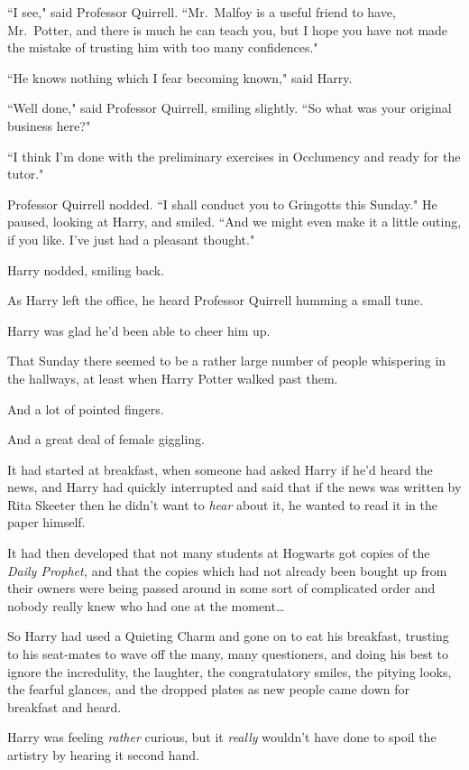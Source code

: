 ``I see," said Professor Quirrell. ``Mr.~Malfoy is a useful friend to have, Mr.~Potter, and there is much he can teach you, but I hope you have not made the mistake of trusting him with too many confidences."

``He knows nothing which I fear becoming known," said Harry.

``Well done," said Professor Quirrell, smiling slightly. ``So what was your original business here?"

``I think I'm done with the preliminary exercises in Occlumency and ready for the tutor."

Professor Quirrell nodded. ``I shall conduct you to Gringotts this Sunday." He paused, looking at Harry, and smiled. ``And we might even make it a little outing, if you like. I've just had a pleasant thought."

Harry nodded, smiling back.

As Harry left the office, he heard Professor Quirrell humming a small tune.

Harry was glad he'd been able to cheer him up.

\later

That Sunday there seemed to be a rather large number of people whispering in the hallways, at least when Harry Potter walked past them.

And a lot of pointed fingers.

And a great deal of female giggling.

It had started at breakfast, when someone had asked Harry if he'd heard the news, and Harry had quickly interrupted and said that if the news was written by Rita Skeeter then he didn't want to \emph{hear} about it, he wanted to read it in the paper himself.

It had then developed that not many students at Hogwarts got copies of the \emph{Daily Prophet,} and that the copies which had not already been bought up from their owners were being passed around in some sort of complicated order and nobody really knew who had one at the moment{\ldots}

So Harry had used a Quieting Charm and gone on to eat his breakfast, trusting to his seat-mates to wave off the many, many questioners, and doing his best to ignore the incredulity, the laughter, the congratulatory smiles, the pitying looks, the fearful glances, and the dropped plates as new people came down for breakfast and heard.

Harry was feeling \emph{rather} curious, but it \emph{really} wouldn't have done to spoil the artistry by hearing it second hand.

